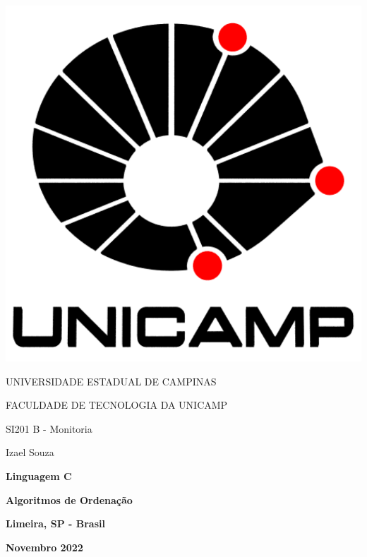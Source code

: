 \thispagestyle{empty}

\noindent\begin{minipage}{0.3\textwidth}
    \includegraphics[scale=0.15]{assets/logo-unicamp.pdf}
\end{minipage}
\hfill
\begin{minipage}{0.6\textwidth}\raggedleft
    UNIVERSIDADE ESTADUAL DE CAMPINAS

    FACULDADE DE TECNOLOGIA DA UNICAMP
    
    SI201 B - Monitoria
    
    Izael Souza
\end{minipage}
\begin{center}
    \hfill%
\end{center}

\begin{center}
    \textbf{\huge Linguagem C}
    
    \hfill
    
    \textbf{\LARGE Algoritmos de Ordenação}
    
\end{center}

\vspace*{\fill}
\begin{center}
    \textbf{Limeira, SP - Brasil}
    
    \textbf{Novembro 2022}
\end{center}
